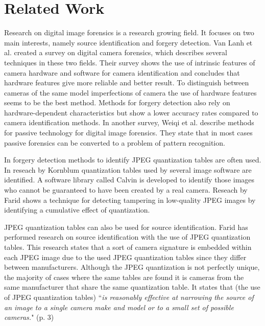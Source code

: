 
\chapter{Related Work} %

\label{ch:literature} %



Research on digital image forensics is a research growing field. It focuses on two main interests, namely source identification and forgery detection. Van Lanh et al. \cite{van2007survey} created a survey on digital camera forensics, which describes several techniques in these two fields. Their survey shows the use of intrinsic features of camera hardware and software for camera identification and concludes that hardware features give more reliable and better result. To distinguish between cameras of the same model imperfections of camera the use of hardware features seems to be the best method. Methods for forgery detection also rely on hardware-dependent characteristics but show a lower accuracy rates compared to camera identification methods. In another survey, Weiqi et al. \cite{luo2007survey} describe methods for passive technology for digital image forensics. They state that in most cases passive forensics can be converted to a problem of pattern recognition.

In forgery detection methods to identify JPEG quantization tables are often used. In reseach by Kornblum\cite{kornblum2008using} quantization tables used by several image software are identified. A software library called Calvin is developed to identify those images who cannot
be guaranteed to have been created by a real camera. Reseach by Farid\cite{4773149} shows a technique for detecting tampering in low-quality JPEG images by identifying a cumulative effect of quantization.

JPEG quantization tables can also be used for source identification. Farid has performed research\cite{farid1}\cite{farid2008digital} on source identification with the use of JPEG quantization tables. This research states that a sort of camera signature is embedded within each JPEG image due to the used JPEG quantization tables since they differ between manufacturers. Although the JPEG quantization is not perfectly unique, the majority of cases where the same tables are found it is cameras from the same manufacturer that share the same quantization table. It states that (the use of JPEG quantization tables) ``\textit{is reasonably effective at narrowing the source of an image to a single camera make and model or to a small set of possible cameras.}" (p. 3)

